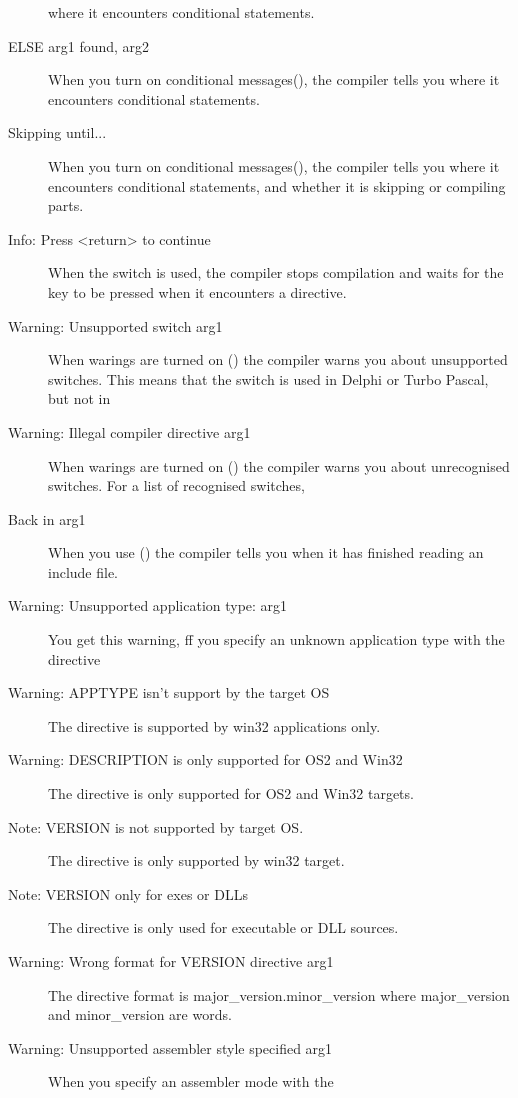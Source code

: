 \begin{description}
 where it encounters conditional statements.
\item [ELSE arg1 found, arg2]
 When you turn on conditional messages(), the compiler tells you
 where it encounters conditional statements.
\item [Skipping until...]
 When you turn on conditional messages(), the compiler tells you
 where it encounters conditional statements, and whether it is skipping or
 compiling parts.
\item [Info: Press <return> to continue]
 When the  switch is used, the compiler stops compilation
 and waits for the  key to be pressed when it encounters
 a  directive.
\item [Warning: Unsupported switch arg1]
 When warings are turned on () the compiler warns you about
 unsupported switches. This means that the switch is used in Delphi or
 Turbo Pascal, but not in \fpc
\item [Warning: Illegal compiler directive arg1]
 When warings are turned on () the compiler warns you about
 unrecognised switches. For a list of recognised switches, \progref
\item [Back in arg1]
 When you use () the compiler tells you when it has finished
 reading an include file.
\item [Warning: Unsupported application type: arg1]
 You get this warning, ff you specify an unknown application type
 with the directive 
\item [Warning: APPTYPE isn't support by the target OS]
 The  directive is supported by win32 applications only.
\item [Warning: DESCRIPTION is only supported for OS2 and Win32]
 The  directive is only supported for OS2 and Win32 targets.
\item [Note: VERSION is not supported by target OS.]
 The  directive is only supported by win32 target.
\item [Note: VERSION only for exes or DLLs]
 The  directive is only used for executable or DLL sources.
\item [Warning: Wrong format for VERSION directive arg1]
 The  directive format is major_version.minor_version
 where major_version and minor_version are words.
\item [Warning: Unsupported assembler style specified arg1]
 When you specify an assembler mode with the 

\end{description}
